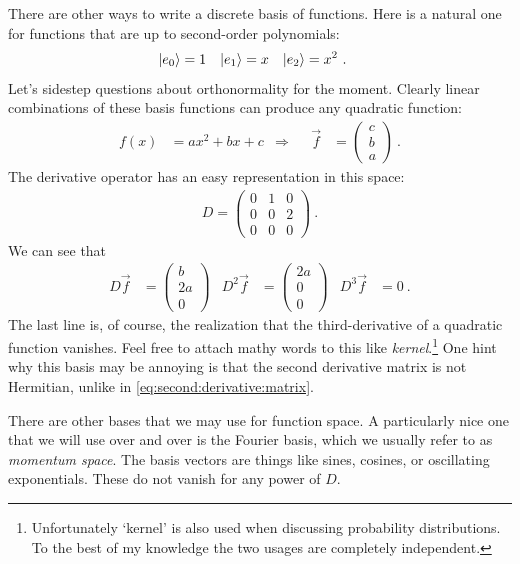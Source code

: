 \documentclass[12pt, oneside]{report}    %
\begin{document}
There are other ways to write a discrete basis of functions. Here is a natural one for functions that are up to second-order polynomials:
\begin{align}
  \left|e_0\right\rangle &= 1
  &
  \left|e_1\right\rangle &= x
  &
  \left|e_2\right\rangle &= x^2 \ .
\end{align}
Let’s sidestep questions about orthonormality for the moment. Clearly linear combinations of these basis functions can produce any quadratic function:
\begin{align}
  f(x) &= a x^2 + bx + c
  & \Rightarrow&&
  \vec{f} &=
  \begin{pmatrix}
     c \\ b \\ a
   \end{pmatrix} \ . 
\end{align}
The derivative operator has an easy representation in this space:
\begin{align}
  D = 
  \begin{pmatrix}
    0 & 1 & 0   \\
    0 & 0 & 2   \\
    0 & 0 & 0   
  \end{pmatrix} \ .
\end{align}
We can see that
\begin{align}
  D \vec{f}  &= 
  \begin{pmatrix}
     b \\
     2 a \\
     0
  \end{pmatrix} 
  &
  D^2 \vec{f}  &= 
  \begin{pmatrix}
     2a \\
     0 \\
     0
  \end{pmatrix} 
  &
  D^3 \vec{f}  &= 
  0 \ .
\end{align}
The last line is, of course, the realization that the third-derivative of a quadratic function vanishes. Feel free to attach mathy words to this like \emph{kernel}.\footnote{Unfortunately `kernel' is also used when discussing probability distributions. To the best of my knowledge the two usages are completely independent.} One hint why this basis may be annoying is that the second derivative matrix is not Hermitian, unlike in \eqref{eq:second:derivative:matrix}.

There are other bases that we may use for function space. A particularly nice one that we will use over and over is the Fourier basis, which we usually refer to as \emph{momentum space}. The basis vectors are things like sines, cosines, or oscillating exponentials. These do not vanish for any power of $D$.
\end{document}
